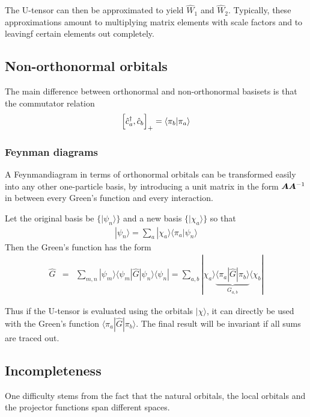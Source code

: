 \documentclass[11pt,a4paper]{report}
\begin{document}
The U-tensor can then be approximated to yield $\hat{W}_1$ and
$\hat{W}_2$. Typically, these approximations amount to multiplying
matrix elements with scale factors and to leavingf certain elements
out completely.

\subsection{Non-orthonormal orbitals}
The main difference\cite{bloechl11_prb84_205101} between orthonormal
and non-orthonormal basisets is that the commutator relation
\begin{eqnarray}
\Bigl[\hat{c}^\dagger_a,\hat{c}_b\Bigr]_+=\langle\pi_b|\pi_a\rangle
\end{eqnarray}

\subsubsection{Feynman diagrams}
A Feynmandiagram in terms of orthonormal orbitals can be transformed
easily into any other one-particle basis, by introducing a unit matrix
in the form $\bm{A}\bm{A}^{-1}$ in between every Green's function
and every interaction. 

Let the original basis be $\{|\psi_n\rangle\}$
and a new basis $\{|\chi_a\rangle\}$ so that
\begin{eqnarray}
|\psi_n\rangle=\sum_a |\chi_a\rangle\langle\pi_a|\psi_n\rangle
\end{eqnarray}
Then the Green's function has the form
\begin{eqnarray}
\hat{G}&=&\sum_{m,n}|\psi_m\rangle
\langle\psi_m|\hat{G}|\psi_n\rangle\langle\psi_n|
=
\sum_{a,b}|\chi_a\rangle
\underbrace{\langle\pi_a|\hat{G}|\pi_b\rangle}_{G_{a,b}}\langle\chi_b|
\end{eqnarray}

Thus if the U-tensor is evaluated using the orbitals $|\chi\rangle$,
it can directly be used with the Green's function
$\langle\pi_a|\hat{G}|\pi_b\rangle$. The final result will be
invariant if all sums are traced out.

\subsection{Incompleteness}
One difficulty stems from the fact that the natural orbitals, the
local orbitals and the projector functions span different spaces.
\end{document}
